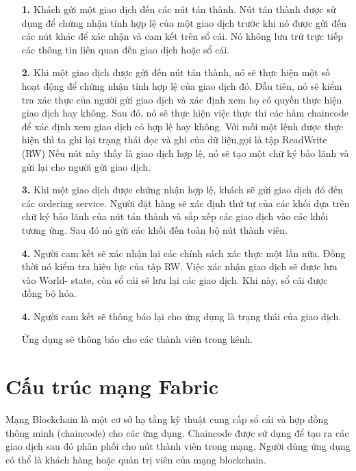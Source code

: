 \begin{itemize}
    \item[\textbf{1.}] Khách gửi một giao dịch đến các  nút tán thành. Nút tán thành được sử dụng để chứng nhận tính hợp 
    lệ của một giao dịch trước khi nó được gửi đến các nút khác để xác nhận và cam kết trên 
    sổ cái. Nó không lưu trữ trực tiếp các thông tin liên quan đến giao dịch hoặc sổ cái.
    \item[\textbf{2.}] Khi một giao dịch được gửi đến nút tán thành, nó sẽ thực hiện một số hoạt 
    động để chứng nhận tính hợp lệ của giao dịch đó. Đầu tiên, nó sẽ kiểm 
    tra xác thực của người gửi giao dịch và xác định xem họ có quyền thực hiện giao dịch hay 
    không. Sau đó, nó sẽ thực hiện việc thực thi các hàm chaincode để xác 
    định xem giao dịch có hợp lệ hay không. Với mỗi một lệnh được thực hiện thì ta ghi lại 
    trạng thái đọc và ghi của dữ liệu,gọi là tập ReadWrite (RW)
    Nếu nút này thấy là giao dịch hợp lệ, nó sẽ tạo một chữ ký bảo lãnh và gửi lại cho người 
    gửi giao dịch. 
    \item[\textbf{3.}] Khi một giao dịch được chứng nhận hợp lệ, khách sẽ gửi giao dịch
    đó đến các ordering service. Người đặt hàng sẽ xác định thứ tự của các khối dựa trên 
    chữ ký bảo lãnh của nút tán thành và sắp xếp các giao dịch vào các khối tương 
    ứng. Sau đó nó gửi các khối đến toàn bộ nút thành viên.
    \item[\textbf{4.}] Người cam kết sẽ xác nhận lại các chính sách xác thực một lần nữa. 
    Đồng thời nó kiểm tra hiệu lực của tập RW. Việc xác nhận giao dịch sẽ được lưu vào World- state, còn sổ cái sẽ lưu lại các giao dịch. 
    Khi này, sổ cái được đồng bộ hóa.
    \item[\textbf{4.}] Người cam kết sẽ thông báo lại cho ứng dụng là trạng thái của giao dịch. 
    
    Ứng dụng sẽ thông báo cho các thành viên trong kênh. \cite{hyperledger}
\end{itemize}

\section{Cấu trúc mạng Fabric}

Mạng Blockchain là một cơ sở hạ tầng kỹ thuật cung cấp sổ cái và hợp đồng thông minh (chaincode) cho các ứng dụng. 
Chaincode được sử dụng để tạo ra các giao dịch sau đó phân phối cho nút thành viên trong mạng. Người dùng ứng dụng
có thể là khách hàng hoặc quản trị viên của mạng blockchain.

